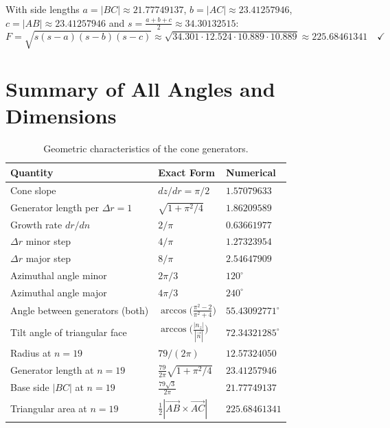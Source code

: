 With side lengths
$a = |BC| \approx 21.77749137$,
$b = |AC| \approx 23.41257946$,
$c = |AB| \approx 23.41257946$ and
$s = \tfrac{a+b+c}{2} \approx 34.30132515$:
\[
  F = \sqrt{s(s-a)(s-b)(s-c)}
  \approx \sqrt{34.301\cdot 12.524\cdot 10.889\cdot 10.889}
  \approx 225.68461341 \quad\checkmark
\]

\section{Summary of All Angles and Dimensions}

\begin{table}[H]
\centering
\renewcommand{\arraystretch}{1.4}
\caption{Geometric characteristics of the cone generators.}
\begin{tabular}{lll}
\toprule
Quantity & Exact Form & Numerical \\
\midrule
Cone slope & $dz/dr = \pi/2$ & $1.57079633$ \\
Generator length per $\Delta r=1$ & $\sqrt{1+\pi^2/4}$ & $1.86209589$ \\
Growth rate $dr/dn$ & $2/\pi$ & $0.63661977$ \\
$\Delta r$ minor step & $4/\pi$ & $1.27323954$ \\
$\Delta r$ major step & $8/\pi$ & $2.54647909$ \\
Azimuthal angle minor & $2\pi/3$ & $120^\circ$ \\
Azimuthal angle major & $4\pi/3$ & $240^\circ$ \\
Angle between generators (both) &
  $\arccos\!\bigl(\tfrac{\pi^2-2}{\pi^2+4}\bigr)$ & $55.43092771^\circ$ \\
Tilt angle of triangular face &
  $\arccos\!\bigl(\tfrac{|n_z|}{|\vec{n}|}\bigr)$ & $72.34321285^\circ$ \\
\midrule
Radius at $n=19$ & $79/(2\pi)$ & $12.57324050$ \\
Generator length at $n=19$ & $\tfrac{79}{2\pi}\sqrt{1+\pi^2/4}$ & $23.41257946$ \\
Base side $|BC|$ at $n=19$ & $\tfrac{79\sqrt{3}}{2\pi}$ & $21.77749137$ \\
Triangular area at $n=19$ & $\tfrac{1}{2}|\vec{AB}\times\vec{AC}|$ & $225.68461341$ \\
\bottomrule
\end{tabular}
\end{table}
